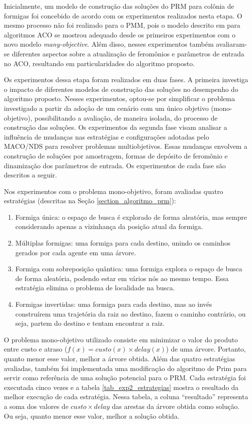 Inicialmente, um modelo de construção das soluções do PRM para colônia de formigas foi concebido de acordo com os experimentos realizados nesta etapa. O mesmo processo não foi realizado para o PMM, pois o modelo descrito em \cite{Alaya2004} para algoritmos ACO se mostrou adequado desde os primeiros experimentos com o novo modelo \textit{many-objective}. Além disso, nesses experimentos também avaliaram-se diferentes aspectos sobre a atualização de feromônios e parâmetros de entrada no ACO, resultando em particularidades do algoritmo proposto.

Os experimentos dessa etapa foram realizados em duas fases. A primeira investiga o impacto de diferentes modelos de construção das soluções no desempenho do algoritmo proposto. Nesses experimentos, optou-se por simplificar o problema investigado a partir da adoção de um cenário com um único objetivo (mono-objetivo), possibilitando a avaliação, de maneira isolada, do processo de construção das soluções. Os experimentos da segunda fase visam analisar a influência de mudanças nas estratégias e configurações adotadas pelo MACO/NDS para resolver problemas multiobjetivos. Essas mudanças envolvem a construção de soluções por amostragem, formas de depósito de feromônio e dinamização dos parâmetros de entrada. Os experimentos de cada fase são descritos a seguir.

Nos experimentos com o problema mono-objetivo, foram avaliadas quatro estratégias (descritas na Seção \ref{section_algoritmo_prm}):

\begin{enumerate}
	\item Formiga única: o espaço de busca é explorado de forma aleatória, mas sempre considerando apenas a vizinhança da posição atual da formiga.
	\item Múltiplas formigas: uma formiga para cada destino, unindo os caminhos gerados por cada agente em uma árvore.
	\item Formiga com sobreposição quântica: uma formiga explora o espaço de busca de forma aleatória, podendo estar em vários nós ao mesmo tempo. Essa estratégia elimina o problema de localidade na busca.
	\item Formigas invertidas: uma formiga para cada destino, mas ao invés construírem uma trajetória da raiz ao destino, fazem o caminho contrário, ou seja, partem do destino e tentam encontrar a raiz.
\end{enumerate}

O problema mono-objetivo utilizado consiste em minimizar o valor do produto entre custo e atraso ($f(x) = custo(x) \times delay(x)$) de uma árvore. Portanto, quanto menor esse valor, melhor a árvore obtida. Além das quatro estratégias avaliadas, também foi implementada uma modificação do algoritmo de Prim \cite{Prim1957} para servir como referência de uma solução potencial para o PRM. Cada estratégia foi executada cinco vezes e a tabela \ref{tab_exp2_estrategias} mostra o resultado da melhor execução de cada estratégia. Nessa tabela, a coluna ``resultado'' representa a soma dos valores de $custo \times delay$ das arestas da árvore obtida como solução. Ou seja, quanto menor esse valor, melhor a solução obtida.

